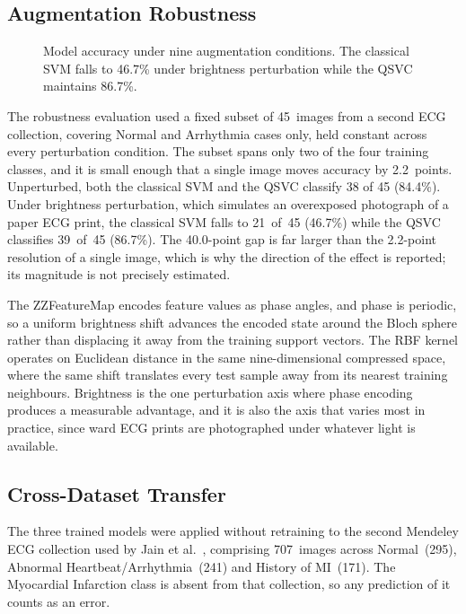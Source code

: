 \documentclass[10pt,conference]{IEEEtran}
\begin{document}
\subsection{Augmentation Robustness}
\label{sec:robust}

\begin{figure}[t]
  \centering
  \caption{Model accuracy under nine augmentation conditions. The
    classical SVM falls to 46.7\% under brightness perturbation while
    the QSVC maintains 86.7\%.}
  \label{fig:augmentation}
\end{figure}

The robustness evaluation used a fixed subset of 45~images from a
second ECG collection, covering Normal and Arrhythmia cases only, held
constant across every perturbation condition. The subset spans only two
of the four training classes, and it is small enough that a single
image moves accuracy by 2.2~points. Unperturbed, both the classical SVM
and the QSVC classify 38 of 45 (84.4\%). Under brightness perturbation,
which simulates an overexposed photograph of a paper ECG print, the
classical SVM falls to 21~of~45 (46.7\%) while the QSVC classifies
39~of~45 (86.7\%). The 40.0-point gap is far larger than the 2.2-point
resolution of a single image, which is why the direction of the effect
is reported; its magnitude is not precisely estimated.

The ZZFeatureMap encodes feature values as phase angles, and phase is
periodic, so a uniform brightness shift advances the encoded state
around the Bloch sphere rather than displacing it away from the training
support vectors. The RBF kernel operates on Euclidean distance in the
same nine-dimensional compressed space, where the same shift translates
every test sample away from its nearest training neighbours. Brightness
is the one perturbation axis where phase encoding produces a measurable
advantage, and it is also the axis that varies most in practice, since
ward ECG prints are photographed under whatever light is available.

\subsection{Cross-Dataset Transfer}
\label{sec:transfer}

The three trained models were applied without retraining to the second
Mendeley ECG collection used by Jain et al.~\cite{jain2025}, comprising
707~images across Normal~(295), Abnormal Heartbeat/Arrhythmia~(241) and
History of MI~(171). The Myocardial Infarction class is absent from
that collection, so any prediction of it counts as an error.
\end{document}
